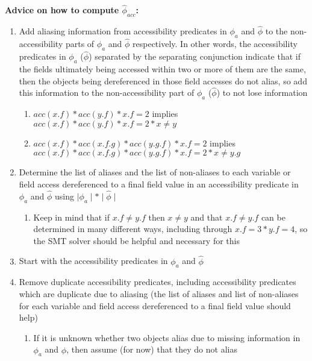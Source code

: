 \documentclass {article}
\newcommand{\fphi}{\widehat{\phi}}
\begin{document}
\textbf{Advice on how to compute $\fphi_{acc}$:}
\begin{enumerate}
\item Add aliasing information from accessibility predicates in $\phi_a$ and $\fphi$ to the non-accessibility parts of $\phi_a$ and $\fphi$ respectively. In other words, the accessibility predicates in $\phi_a$ ($\fphi$) separated by the separating conjunction indicate that if the fields ultimately being accessed within two or more of them are the same, then the objects being dereferenced in those field accesses do not alias, so add this information to the non-accessibility part of $\phi_a$ ($\fphi$) to not lose information
	\begin{enumerate}
	\item $acc(x.f) \ast acc(y.f) \ast x.f = 2$ implies $acc(x.f) \ast acc(y.f) \ast x.f = 2 \ast x \neq y$
	\item $acc(x.f) \ast acc(x.f.g) \ast acc(y.g.f) \ast x.f = 2$ implies $acc(x.f) \ast acc(x.f.g) \ast acc(y.g.f) * x.f = 2 \ast x \neq y.g$
	\end{enumerate}
\item Determine the list of aliases and the list of non-aliases to each variable or field access dereferenced to a final field value in an accessibility predicate in $\phi_a$ and $\fphi$ using $\mid \phi_a \mid \ast \mid \fphi \mid$
	\begin{enumerate}
	\item Keep in mind that if $x.f \neq y.f$ then $x \neq y$ and that $x.f \neq y.f$ can be determined in many different ways, including through $x.f = 3 * y.f = 4$, so the SMT solver should be helpful and necessary for this
	\end{enumerate}
\item Start with the accessibility predicates in $\phi_a$ and $\fphi$
\item Remove duplicate accessibility predicates, including accessibility predicates which are duplicate due to aliasing (the list of aliases and list of non-aliases for each variable and field access dereferenced to a final field value should help)
	\begin{enumerate}
	\item If it is unknown whether two objects alias due to missing information in $\phi_a$ and $\fphi$, then assume (for now) that they do not alias

\end{enumerate}
\end{enumerate}
\end{document}
